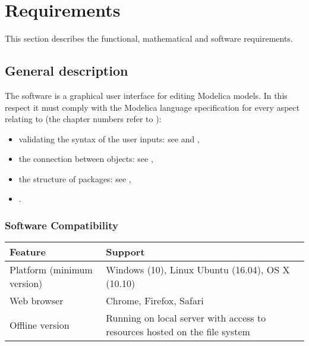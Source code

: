 \documentclass[letterpaper,10pt, openany,english]{sphinxmanual}
\begin{document}
\chapter{Requirements}
\label{\detokenize{requirements:requirements}}\label{\detokenize{requirements:sec-requirements}}\label{\detokenize{requirements::doc}}
This section describes the functional, mathematical and software requirements.


\section{General description}
\label{\detokenize{requirements:general-description}}
The software is a graphical user interface for editing Modelica models.
In this respect it must comply with the Modelica language specification  for every aspect relating to (the chapter numbers refer to ):
\begin{itemize}
\item {} 
validating the syntax of the user inputs: see  and ,

\item {} 
the connection between objects: see ,

\item {} 
the structure of packages: see ,

\item {} 
.

\end{itemize}


\subsection{Software Compatibility}
\label{\detokenize{requirements:software-compatibility}}

\begin{savenotes}\sphinxattablestart
\centering
{}
\sphinxthecaptionisattop
{}\label{\detokenize{requirements:id6}}\label{\detokenize{requirements:tab-environment}}
\sphinxaftertopcaption
\begin{tabulary}{\linewidth}[t]{|T|T|}
\hline
\sphinxstyletheadfamily 
Feature
&\sphinxstyletheadfamily 
Support
\\
\hline
Platform (minimum version)
&
Windows (10), Linux Ubuntu (16.04), OS X (10.10)
\\
\hline
Web browser
&
Chrome, Firefox, Safari
\\
\hline
Offline version
&
Running on local server with access to resources hosted on the file system
\\
\hline
\end{tabulary}
\par
\sphinxattableend\end{savenotes}
\end{document}
